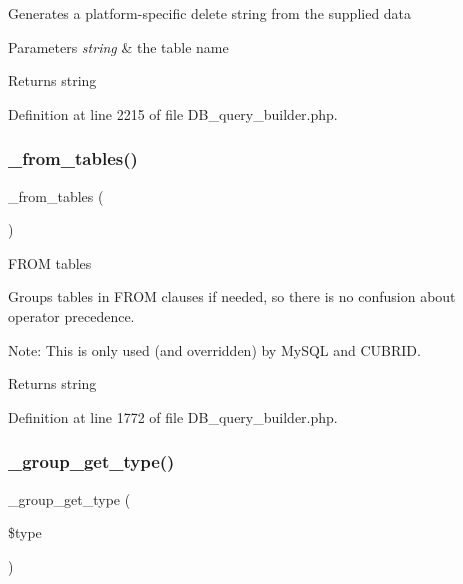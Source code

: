 Generates a platform-\/specific delete string from the supplied data


\begin{DoxyParams}{Parameters}
{\em string} & the table name \\
\hline
\end{DoxyParams}
\begin{DoxyReturn}{Returns}
string 
\end{DoxyReturn}


Definition at line 2215 of file D\+B\+\_\+query\+\_\+builder.\+php.

\mbox{\label{class_c_i___d_b__query__builder_aef43f7e3e7b71d337ff3724c5eb14f10}} 
\subsubsection{\texorpdfstring{\_from\_tables()}{\_from\_tables()}}
{\footnotesize\ttfamily \+\_\+from\+\_\+tables (\begin{DoxyParamCaption}{ }\end{DoxyParamCaption})\hspace{0.3cm}{\ttfamily [protected]}}

F\+R\+OM tables

Groups tables in F\+R\+OM clauses if needed, so there is no confusion about operator precedence.

Note\+: This is only used (and overridden) by My\+S\+QL and C\+U\+B\+R\+ID.

\begin{DoxyReturn}{Returns}
string 
\end{DoxyReturn}


Definition at line 1772 of file D\+B\+\_\+query\+\_\+builder.\+php.

\mbox{\label{class_c_i___d_b__query__builder_a0101619da9c48cfa269730ace38a774a}} 
\subsubsection{\texorpdfstring{\_group\_get\_type()}{\_group\_get\_type()}}
{\footnotesize\ttfamily \+\_\+group\+\_\+get\+\_\+type (\begin{DoxyParamCaption}\item[{}]{\$type }\end{DoxyParamCaption})\hspace{0.3cm}{\ttfamily [protected]}}

